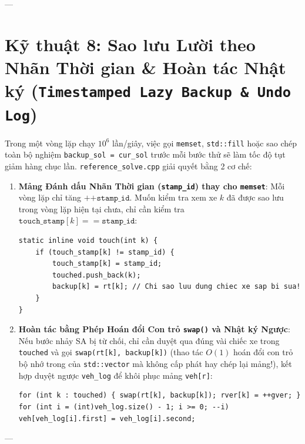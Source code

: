 \documentclass[11pt,a4paper]{article}
\begin{document}
---

\section{Kỹ thuật 8: Sao lưu Lười theo Nhãn Thời gian \& Hoàn tác Nhật ký (\texttt{Timestamped Lazy Backup \& Undo Log})}

Trong một vòng lặp chạy $10^6$ lần/giây, việc gọi \texttt{memset}, \texttt{std::fill} hoặc sao chép toàn bộ nghiệm \texttt{backup\_sol = cur\_sol} trước mỗi bước thử sẽ làm tốc độ tụt giảm hàng chục lần. \texttt{reference\_solve.cpp} giải quyết bằng 2 cơ chế:

\begin{enumerate}[leftmargin=1.5em]
    \item \textbf{Mảng Đánh dấu Nhãn Thời gian (\texttt{stamp\_id}) thay cho \texttt{memset}}:
    Mỗi vòng lặp chỉ tăng $\texttt{++stamp\_id}$. Muốn kiểm tra xem xe $k$ đã được sao lưu trong vòng lặp hiện tại chưa, chỉ cần kiểm tra $\texttt{touch\_stamp}[k] == \texttt{stamp\_id}$:
\begin{lstlisting}
static inline void touch(int k) {
    if (touch_stamp[k] != stamp_id) {
        touch_stamp[k] = stamp_id;
        touched.push_back(k);
        backup[k] = rt[k]; // Chi sao luu dung chiec xe sap bi sua!
    }
}
\end{lstlisting}
    \item \textbf{Hoàn tác bằng Phép Hoán đổi Con trỏ \texttt{swap()} và Nhật ký Ngược}:
    Nếu bước nhảy SA bị từ chối, chỉ cần duyệt qua đúng vài chiếc xe trong \texttt{touched} và gọi \texttt{swap(rt[k], backup[k])} (thao tác $O(1)$ hoán đổi con trỏ bộ nhớ trong của \texttt{std::vector} mà không cấp phát hay chép lại mảng!), kết hợp duyệt ngược \texttt{veh\_log} để khôi phục mảng \texttt{veh[r]}:
\begin{lstlisting}
for (int k : touched) { swap(rt[k], backup[k]); rver[k] = ++gver; }
for (int i = (int)veh_log.size() - 1; i >= 0; --i) veh[veh_log[i].first] = veh_log[i].second;
\end{lstlisting}
\end{enumerate}

---

\end{document}
